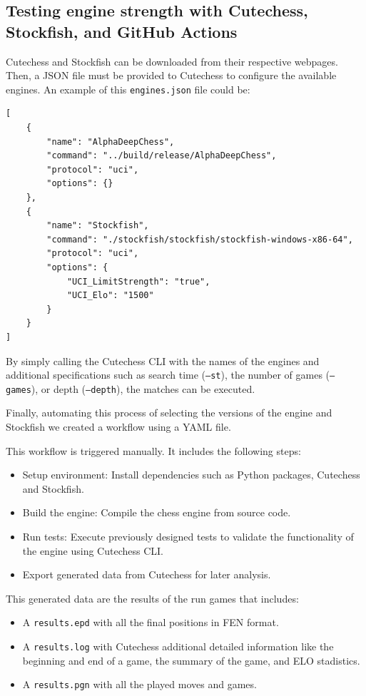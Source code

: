 \subsection{Testing engine strength with Cutechess, Stockfish, and GitHub Actions}

Cutechess and Stockfish can be downloaded from their respective webpages. Then, a JSON file must be provided to Cutechess to configure the available engines. An example of this \texttt{engines.json} file could be:

\vspace{1em}

\begin{lstlisting}[breaklines=true, frame=single]
[
    {
        "name": "AlphaDeepChess",
        "command": "../build/release/AlphaDeepChess",
        "protocol": "uci",
        "options": {}
    },
    {
        "name": "Stockfish",
        "command": "./stockfish/stockfish/stockfish-windows-x86-64",
        "protocol": "uci",
        "options": {
            "UCI_LimitStrength": "true",
            "UCI_Elo": "1500"
        }
    }
]
\end{lstlisting}

\noindent By simply calling the Cutechess CLI with the names of the engines and additional specifications such as search time (\texttt{--st}), the number of games (\texttt{--games}), or depth (\texttt{--depth}), the matches can be executed.

\vspace{1em}

\noindent Finally, automating this process of selecting the versions of the engine and Stockfish we created a workflow using a YAML file.

\vspace{1em}

\noindent This workflow is triggered manually. It includes the following steps:

\begin{itemize}
    \item Setup environment: Install dependencies such as Python packages, Cutechess and Stockfish.
    \item Build the engine: Compile the chess engine from source code.
    \item Run tests: Execute previously designed tests to validate the functionality of the engine using Cutechess CLI.
    \item Export generated data from Cutechess for later analysis.
\end{itemize}

This generated data are the results of the run games that includes:

\begin{itemize}
    \item A \texttt{results.epd} with all the final positions in FEN format.
    \item A \texttt{results.log} with Cutechess additional detailed information like the beginning and end of a game, the summary of the game, and ELO stadistics.
    \item A \texttt{results.pgn} with all the played moves and games.
\end{itemize}
